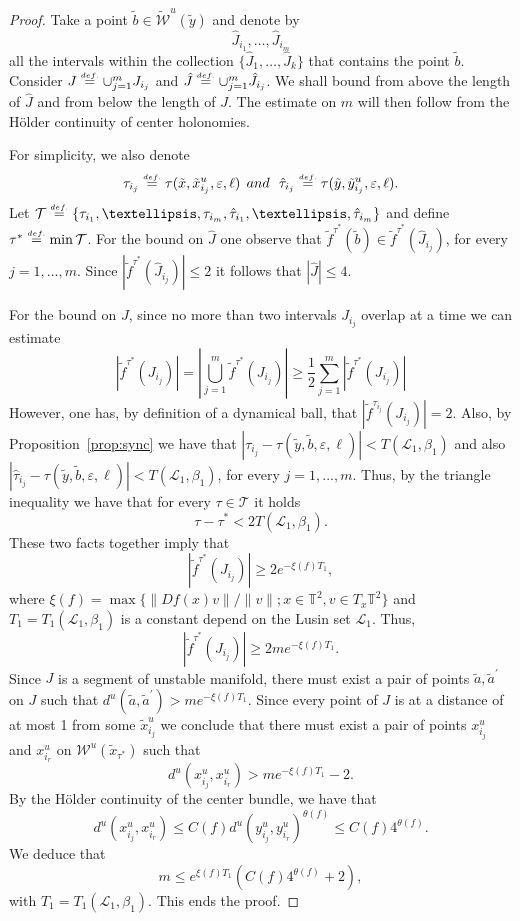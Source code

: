 \documentclass[a4paper,11pt,reqno]{amsart}
\newcommand{\TT}{{\mathbb{T}^2}}
\newcommand{\cL}{{\mathcal L}}
\newcommand{\cW}{{\mathcal W}}
\newcommand{\eps}{\varepsilon}
\newcommand{\eqdef}{\stackrel{\scriptscriptstyle\textrm def.}{=}}
\newcommand{\tix}{\tilde{x}}
\newcommand{\ta}{\tilde{a}}
\newcommand{\tb}{\tilde{b}}
\newcommand{\tif}{\tilde{f}}
\theoremstyle{definition}
\begin{document}
\begin{proof}
Take a point $\tb\in\widetilde{\cW}^u(\tilde{y})$ and denote by 
\[
\hat{J}_{i_1},\dots,\hat{J}_{i_m}
\]
all the intervals within the collection $\{\hat{J}_1,\dots,\hat{J}_k\}$ that contains the point $\tb$. Consider $J\eqdef\cup_{j=1}^mJ_{i_j}$ and $\hat{J}\eqdef\cup_{j=1}^m\hat{J}_{i_j}$. We shall bound from above the length of $\hat{J}$ and from below the length of $J$. The estimate on $m$ will then follow from the Hölder continuity of center holonomies.

For simplicity, we also denote
\[
\tau_{i_j}\eqdef\tau(\tix,\tix^u_{i_j},\eps,\ell)\:\:\textrm{and}\:\:\:\hat{\tau}_{i_j}\eqdef\tau(\tilde{y},\tilde{y}^u_{i_j},\eps,\ell).
\]
Let $\mathcal{T}\eqdef\{\tau_{i_1},\dots,\tau_{i_m},\hat{\tau}_{i_1},\dots,\hat{\tau}_{i_m}\}$ and define $\tau^*\eqdef\min\mathcal{T}$. For the bound on $\hat{J}$ one observe that $\tif^{\tau^*}(\tb)\in\tif^{\tau^*}(\hat{J}_{i_j})$, for every $j=1,\dots,m$. Since $|\tif^{\tau^*}(\hat{J}_{i_j})|\leq 2$ it follows that $|\hat{J}|\leq 4$. 

For the bound on $J$, since no more than two intervals $J_{i_j}$ overlap at a time we can estimate
\[
\left|\tif^{\tau^*}(J_{i_j})\right|=\left|\bigcup_{j=1}^m\tif^{\tau^*}(J_{i_j})\right|\geq\frac{1}{2}\sum_{j=1}^m\left|\tif^{\tau^*}(J_{i_j})\right|
\]
However, one has, by definition of a dynamical ball, that $\left|\tif^{\tau_{i_j}}(J_{i_j})\right|=2$. Also, by Proposition~\ref{prop:sync} we have that $|\tau_{i_j}-\tau(\tilde{y},\tb,\eps,\ell)|<T(\cL_1,\beta_1)$ and also $|\hat{\tau}_{i_j}-\tau(\tilde{y},\tb,\eps,\ell)|<T(\cL_1,\beta_1)$, for every $j=1,...,m$. Thus, by the triangle inequality we have that for every $\tau\in\mathcal{T}$ it holds
\[
\tau-\tau^*<2T(\cL_1,\beta_1).
\] 
These two facts together imply that 
\[
\left|\tif^{\tau^*}(J_{i_j})\right|\geq 2e^{-\xi(f)T_1},
\]
where $\xi(f)=\max\{\|Df(x)v\|/\|v\|;x\in\TT,v\in T_x\TT\}$ and $T_1=T_1(\cL_1,\beta_1)$ is a constant depend on the Lusin set $\cL_1$. Thus,
\[
\left|\tif^{\tau^*}(J_{i_j})\right|\geq 2me^{-\xi(f)T_1}.
\]
Since $J$ is a segment of unstable manifold, there must exist a pair of points $\ta,\ta^{\prime}$ on $J$ such that $d^u(\ta,\ta^{\prime})>me^{-\xi(f)T_1}$. Since every point of $J$ is at a distance of at most 1 from some $\tix^u_{i_j}$ we conclude that there must exist a pair of points $x^u_{i_j}$ and $x^u_{i_r}$ on $\cW^u(\tix_{\tau^*})$ such that 
\[
d^u(x^u_{i_j},x^u_{i_r})>me^{-\xi(f)T_1}-2.
\]  
By the Hölder continuity of the center bundle, we have that 
\[
d^u(x^u_{i_j},x^u_{i_r})\leq C(f)d^u(y^u_{i_j},y^u_{i_r})^{\theta(f)}\leq C(f)4^{\theta(f)}.
\]
We deduce that
\[
m\leq e^{\xi(f)T_1}\left(C(f)4^{\theta(f)}+2\right),
\]
with $T_1=T_1(\cL_1,\beta_1)$. This ends the proof.
\end{proof}
\end{document}
